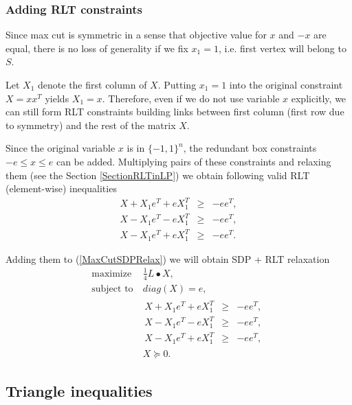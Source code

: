 \documentclass[12pt]{book}
\theoremstyle{definition}
\begin{document}
\subsubsection{Adding RLT constraints}
Since max cut is symmetric in a sense that objective value for $x$ and $-x$ are equal, there is no loss of generality if we fix $x_1 = 1$, i.e. first vertex will belong to $S$. 

Let $X_1$ denote the first column of $X$. Putting $x_1 = 1$ into the original constraint $X = xx^T$ yields $X_1 = x$.
Therefore, even if we do not use variable $x$ explicitly, we can still form RLT constraints building links between first column (first row due to symmetry) and the rest of the matrix $X$.

Since the original variable $x$ is in $\{-1,1\}^n$, the redundant box constraints $-e\leq x\leq e$ can be added. Multiplying pairs of these constraints and relaxing them (see the Section \ref{SectionRLTinLP}) we obtain following valid RLT (element-wise) inequalities
\begin{equation}
\label{MaxCutRLTInequalities}
\begin{array}{lcl}
		 X + X_1e^T + eX_1^T & \geq & -ee^T, \\
		 X - X_1e^T - eX_1^T & \geq & -ee^T, \\
		 X - X_1e^T + eX_1^T & \geq & -ee^T.
\end{array}
\end{equation}

Adding them to (\ref{MaxCutSDPRelax}) we will obtain SDP + RLT relaxation 
\begin{equation}
\label{MaxCutSDP+RLTRelax}
\begin{array}{ll}
\mbox{maximize} & \ \frac{1}{4}L\bullet X, \\
\mbox{subject to} & \ diag(X) = e , \\
& \begin{array}{lcl}
		 X + X_1e^T + eX_1^T & \geq & -ee^T, \\
		 X - X_1e^T - eX_1^T & \geq & -ee^T, \\
		 X - X_1e^T + eX_1^T & \geq & -ee^T,
\end{array} \\
&\	X\succeq 0.
\end{array}
\end{equation} 


\subsection{Triangle inequalities}
\end{document}
